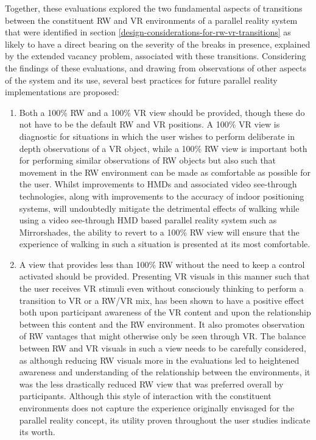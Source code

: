 Together, these evaluations explored the two fundamental aspects of transitions between the constituent RW and VR environments of a parallel reality system that were identified in section \ref{design-considerations-for-rw-vr-transitions} as likely to have a direct bearing on the severity of the breaks in presence, explained by the extended vacancy problem, associated with these transitions. Considering the findings of these evaluations, and drawing from observations of other aspects of the system and its use, several best practices for future parallel reality implementations are proposed:

\begin{enumerate}
	\item Both a 100\% RW and a 100\% VR view should be provided, though these do not have to be the default RW and VR positions. A 100\% VR view is diagnostic for situations in which the user wishes to perform deliberate in depth observations of a VR object, while a 100\% RW view is important both for performing similar observations of RW objects but also such that movement in the RW environment can be made as comfortable as possible for the user. Whilst improvements to HMDs and associated video see-through technologies, along with improvements to the accuracy of indoor positioning systems, will undoubtedly mitigate the detrimental effects of walking while using a video see-through HMD based parallel reality system such as Mirrorshades, the ability to revert to a 100\% RW view will ensure that the experience of walking in such a situation is presented at its most comfortable.
	\item A view that provides less than 100\% RW without the need to keep a control activated should be provided. Presenting VR visuals in this manner such that the user receives VR stimuli even without consciously thinking to perform a transition to VR or a RW/VR mix, has been shown to have a positive effect both upon participant awareness of the VR content and upon the relationship between this content and the RW environment. It also promotes observation of RW vantages that might otherwise only be seen through VR. The balance between RW and VR visuals in such a view needs to be carefully considered, as although reducing RW visuals more in the evaluations led to heightened awareness and understanding of the relationship between the environments, it was the less drastically reduced RW view that was preferred overall by participants. Although this style of interaction with the constituent environments does not capture the experience originally envisaged for the parallel reality concept, its utility proven throughout the user studies indicate its worth.

\end{enumerate}
